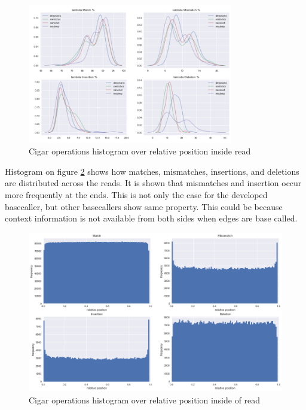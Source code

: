 \documentclass[times, utf8, diplomski, numeric, english]{fer}
\begin{document}
\begin{figure}[!htb]
	\begin{center}
		\includegraphics[width=0.8\textwidth]{./imgs/results/lambda/kde_cigar_small.png}
		\caption{Cigar operations histogram over relative position inside read}
		\label{fg:lambda_kde}
	\end{center}
\end{figure}

Histogram on figure \ref{fg:cigar_op_dist} shows how matches, mismatches, insertions, and deletions are distributed across the reads. It is shown that mismatches and insertion occur more frequently at the ends. This is not only the case for the developed basecaller, but other basecallers show same property. This could be because context information is not available from both sides when edges are base called.

\begin{figure}[!ht]
	\begin{center}
		\includegraphics[width=1\textwidth]{./imgs/operation_distributed_r9.png}
		\caption{Cigar operations histogram over relative position inside of read}
		\label{fg:cigar_op_dist}
	\end{center}
\end{figure}
\end{document}
